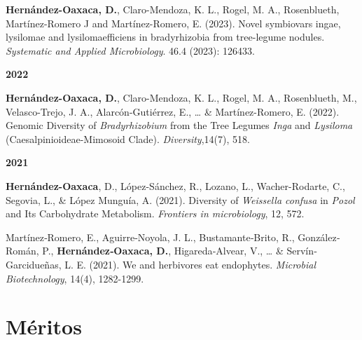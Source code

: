 \documentclass[11pt,a4paper,]{awesome-cv}
\begin{document}
\textbf{Hernández-Oaxaca, D.}, Claro-Mendoza, K. L., Rogel, M. A.,
Rosenblueth, Martínez-Romero J and Martínez-Romero, E. (2023). Novel
symbiovars ingae, lysilomae and lysilomaefficiens in bradyrhizobia from
tree-legume nodules. \emph{Systematic and Applied Microbiology}. 46.4
(2023): 126433.

\setlength{\leftskip}{0cm}

\textbf{2022}

\setlength{\leftskip}{1cm}

\textbf{Hernández-Oaxaca, D.}, Claro-Mendoza, K. L., Rogel, M. A.,
Rosenblueth, M., Velasco-Trejo, J. A., Alarcón-Gutiérrez, E., \ldots{}
\& Martínez-Romero, E. (2022). Genomic Diversity of
\emph{Bradyrhizobium} from the Tree Legumes \emph{Inga} and
\emph{Lysiloma} (Caesalpinioideae-Mimosoid Clade).
\emph{Diversity},14(7), 518.

\setlength{\leftskip}{0cm}

\textbf{2021}

\setlength{\leftskip}{1cm}

\textbf{Hernández-Oaxaca}, D., López-Sánchez, R., Lozano, L.,
Wacher-Rodarte, C., Segovia, L., \& López Munguía, A. (2021). Diversity
of \emph{Weissella confusa} in \emph{Pozol} and Its Carbohydrate
Metabolism. \emph{Frontiers in microbiology}, 12, 572.

Martínez‐Romero, E., Aguirre‐Noyola, J. L., Bustamante‐Brito, R.,
González‐Román, P., \textbf{Hernández‐Oaxaca, D.}, Higareda‐Alvear, V.,
\ldots{} \& Servín‐Garcidueñas, L. E. (2021). We and herbivores eat
endophytes. \emph{Microbial Biotechnology}, 14(4), 1282-1299.

\setlength{\leftskip}{0cm}

\hypertarget{muxe9ritos}{%
\section{Méritos}\label{muxe9ritos}}

\footnotesize

\begin{cventries}
\end{cventries}
\end{document}

